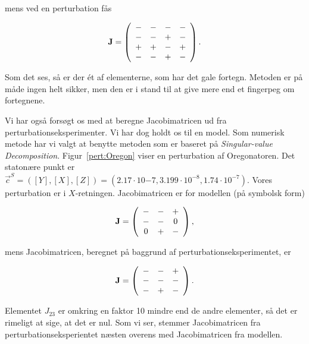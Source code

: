mens ved en perturbation f{\aa}s

\[
  \mbox{${\bf J}$} = \left(
  \begin{array}{cccc}
    - & - & - & - \\
    - & - & + & - \\
    + & + & - & + \\
    - & - & + & - \\
  \end{array}
  \right).
\]

Som det ses, s{\aa} er der \'{e}t af elementerne, som har
det gale fortegn. Metoden er p{\aa} m{\aa}de ingen helt sikker, men
den er i stand til at give mere end et fingerpeg om
fortegnene.

\vspace{4.0mm}
Vi har ogs{\aa} fors{\o}gt os med at beregne Jacobimatricen
ud fra perturbationseksperimenter. Vi har dog holdt os til
en model. Som numerisk metode har vi valgt at benytte metoden 
som er baseret p{\aa} {\em Singular-value Decomposition\/}.
Figur~\ref{pert:Oregon} viser en perturbation af Oregonatoren.
Det staton{\ae}re punkt er $\vec{c}^S = ([Y], [X], [Z]) =
(2.17\cdot 10{-7}, 3.199\cdot 10^{-8}, 1.74\cdot 10^{-7})$.
Vores perturbation er i $X$-retningen. Jacobimatricen er
for modellen (p{\aa} symbolsk form)

\[
  \mbox{${\bf J}$} = \left(
  \begin{array}{ccc}
    - & - & + \\
    - & - & 0 \\
    0 & + & - 
  \end{array}
  \right),
\]

mens Jacobimatricen, beregnet p{\aa} baggrund af
perturbationseksperimentet, er

\[
  \mbox{${\bf J}$} = \left(
  \begin{array}{ccc}
    - & - & + \\
    - & - & - \\
    - & + & -
  \end{array}
  \right).
\]

Elementet $J_{23}$ er omkring en faktor 10 mindre end de
andre elementer, s{\aa} det er rimeligt at sige, at det er
nul. Som vi ser, stemmer Jacobimatricen fra
perturbationseksperientet n{\ae}sten overens med
Jacobimatricen fra modellen.

